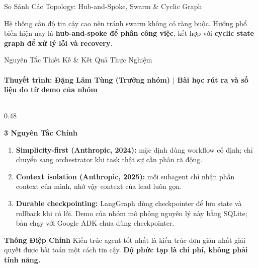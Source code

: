 \documentclass[aspectratio=1610,10pt,xcolor={table}]{beamer}
\begin{document}
\begin{frame}{So Sánh Các Topology: Hub-and-Spoke, Swarm \& Cyclic Graph}
  \vspace{0.2cm}
  \begin{tcolorbox}[colback=boxbg,colframe=hcmutblue,title={\textbf{Lựa Chọn Cho Hệ Thống Production}},fonttitle=\footnotesize\bfseries]
    \footnotesize Hệ thống cần độ tin cậy cao nên tránh swarm không có ràng buộc. Hướng phổ biến hiện nay là \textbf{hub-and-spoke để phân công việc}, kết hợp với \textbf{cyclic state graph để xử lý lỗi và recovery}.
  \end{tcolorbox}
\end{frame}

\begin{frame}{Nguyên Tắc Thiết Kế \& Kết Quả Thực Nghiệm}
  \framesubtitle{Thuyết trình: Đặng Lâm Tùng (Trưởng nhóm) $\vert$ Bài học rút ra và số liệu đo từ demo của nhóm}

  \begin{columns}[t]
    \begin{column}{0.48\textwidth}
      \begin{block}{\textbf{3 Nguyên Tắc Chính}}
        \footnotesize
        \begin{enumerate}\scriptsize
          \item \textbf{Simplicity-first (Anthropic, 2024):} mặc định dùng workflow cố định; chỉ chuyển sang orchestrator khi task thật sự cần phân rã động.
          \item \textbf{Context isolation (Anthropic, 2025):} mỗi subagent chỉ nhận phần context của mình, nhờ vậy context của lead luôn gọn.
          \item \textbf{Durable checkpointing:} LangGraph dùng checkpointer để lưu state và rollback khi có lỗi. Demo của nhóm mô phỏng nguyên lý này bằng SQLite; bản chạy với Google ADK chưa dùng checkpointer.
        \end{enumerate}
      \end{block}
      \vspace{0.05cm}
      \begin{alertblock}{\footnotesize \textbf{Thông Điệp Chính}}
        \scriptsize Kiến trúc agent tốt nhất là kiến trúc đơn giản nhất giải quyết được bài toán một cách tin cậy. \textbf{Độ phức tạp là chi phí, không phải tính năng.}
      \end{alertblock}
    \end{column}


\end{columns}
\end{frame}
\end{document}
